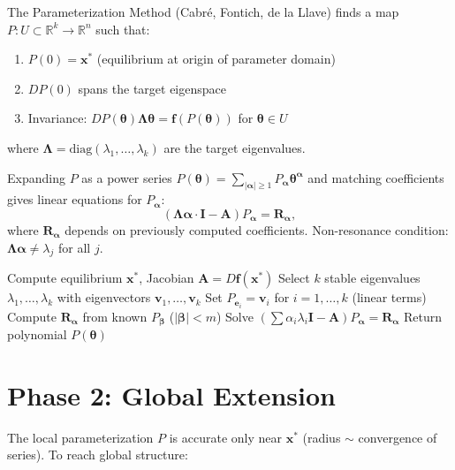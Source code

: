 The Parameterization Method (Cabré, Fontich, de la Llave) finds a map $P: U \subset \mathbb{R}^k \to \mathbb{R}^n$ such that:
\begin{enumerate}
    \item $P(0) = \bm{x}^*$ (equilibrium at origin of parameter domain)
    \item $DP(0)$ spans the target eigenspace
    \item Invariance: $DP(\bm{\theta}) \bm{\Lambda}\bm{\theta} = \bm{f}(P(\bm{\theta}))$ for $\bm{\theta} \in U$
\end{enumerate}
where $\bm{\Lambda} = \mathrm{diag}(\lambda_1,\dots,\lambda_k)$ are the target eigenvalues.

Expanding $P$ as a power series $P(\bm{\theta}) = \sum_{|\bm{\alpha}|\ge 1} P_{\bm{\alpha}} \bm{\theta}^{\bm{\alpha}}$ and matching coefficients gives linear equations for $P_{\bm{\alpha}}$:
\[
(\bm{\Lambda}\bm{\alpha} \cdot \bm{I} - \bm{A}) P_{\bm{\alpha}} = \bm{R}_{\bm{\alpha}},
\]
where $\bm{R}_{\bm{\alpha}}$ depends on previously computed coefficients. Non-resonance condition: $\bm{\Lambda}\bm{\alpha} \neq \lambda_j$ for all $j$.

\begin{algorithm}
\caption{Parameterization Method (local stable manifold)} \cite{cabre2003parameterization}
\label{alg:param}
\begin{algorithmic}[1]
\State Compute equilibrium $\bm{x}^*$, Jacobian $\bm{A} = D\bm{f}(\bm{x}^*)$
\State Select $k$ stable eigenvalues $\lambda_1,\dots,\lambda_k$ with eigenvectors $\bm{v}_1,\dots,\bm{v}_k$
\State Set $P_{\bm{e}_i} = \bm{v}_i$ for $i=1,\dots,k$ (linear terms)
        \State Compute $\bm{R}_{\bm{\alpha}}$ from known $P_{\bm{\beta}}$ ($|\bm{\beta}| < m$)
        \State Solve $(\sum \alpha_i \lambda_i \bm{I} - \bm{A}) P_{\bm{\alpha}} = \bm{R}_{\bm{\alpha}}$
    \EndFor
\EndFor
\State Return polynomial $P(\bm{\theta})$
\end{algorithmic}
\end{algorithm}

\section{Phase 2: Global Extension}
\label{sec:3dp:global}

The local parameterization $P$ is accurate only near $\bm{x}^*$ (radius $\sim$ convergence of series). To reach global structure:

